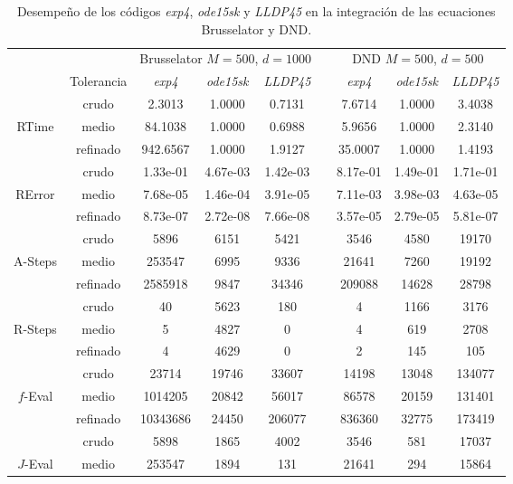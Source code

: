 \begin{table}[htb]
	\caption{Desempeño de los códigos \emph{exp4}, \emph{ode15sk} y \emph{LLDP45} en la integración de las ecuaciones Brusselator y DND.}
	\begin{adjustbox}{width=0.8\columnwidth,center}
	\begin{tabular}{  ccccccccc }
		\hline
		& & \multicolumn{3}{c}{Brusselator $M=500$, $d=1000$ } & & \multicolumn{3}{c}{DND $M=500$, $d=500$}\\
		\cline{3-5} \cline{7-9}
		& Tolerancia & \emph{exp4} & \emph{ode15sk} & \emph{LLDP45} & & \emph{exp4} & \emph{ode15sk} & \emph{LLDP45} \\
		\hline
		& crudo & 2.3013 & 1.0000 & 0.7131  & & 7.6714 & 1.0000 & 3.4038 \\
		RTime  & medio & 84.1038 & 1.0000 & 0.6988  & & 5.9656 & 1.0000 & 2.3140  \\
		& refinado & 942.6567 & 1.0000 & 1.9127  & & 35.0007 & 1.0000 & 1.4193 \\
		\hline
		& crudo & 1.33e-01 & 4.67e-03 & 1.42e-03  & & 8.17e-01 & 1.49e-01 & 1.71e-01 \\
		RError  & medio & 7.68e-05 & 1.46e-04 & 3.91e-05  & & 7.11e-03 & 3.98e-03 & 4.63e-05 \\
		& refinado & 8.73e-07 & 2.72e-08 & 7.66e-08  & & 3.57e-05 & 2.79e-05 & 5.81e-07 \\
		\hline
		& crudo & 5896 & 6151 & 5421 &  & 3546 & 4580 & 19170 \\
		A-Steps  & medio & 253547 & 6995 & 9336  & & 21641 & 7260 & 19192 \\
		& refinado & 2585918 & 9847 & 34346  & & 209088 & 14628 & 28798 \\
		\hline
		& crudo & 40 & 5623 & 180  & & 4 & 1166 & 3176 \\
		R-Steps  & medio & 5 & 4827 & 0  & & 4 & 619 & 2708 \\
		& refinado & 4 & 4629 & 0  & & 2 & 145 & 105 \\
		\hline
		& crudo & 23714 & 19746 & 33607  & & 14198 & 13048 & 134077 \\
		$f$-Eval  & medio & 1014205 & 20842 & 56017  & & 86578 & 20159 & 131401 \\
		& refinado & 10343686 & 24450 & 206077  & & 836360 & 32775 & 173419 \\
		\hline
		& crudo & 5898 & 1865 & 4002 &  & 3546 & 581 & 17037 \\
		$J$-Eval  & medio & 253547 & 1894 & 131 & &  21641 & 294 & 15864  \\

\end{tabular}
\end{adjustbox}
\end{table}
